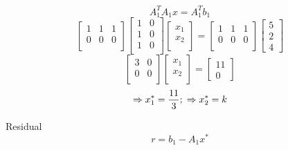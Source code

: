 \documentclass[unicode,11pt,a4paper,oneside,numbers=endperiod,openany]{scrartcl}
\begin{document}
\begin{itemize}
    \begin{equation}
	    A_1^TA_1x = A_1^Tb_1
	\end{equation}
    \[
    	\begin{bmatrix}
            1 & 1 & 1 \\
            0 & 0 & 0\\
        \end{bmatrix}
        \begin{bmatrix}
            1 & 0 \\
            1 & 0 \\
            1 & 0 \\
        \end{bmatrix}
        \begin{bmatrix}
        x_1 \\ x_2 \\ 
        \end{bmatrix}
        =
        \begin{bmatrix}
            1 & 1 & 1 \\
            0 & 0 & 0\\
        \end{bmatrix}
        \begin{bmatrix}
        5 \\ 2 \\ 4
        \end{bmatrix}
    \]
    \[
        \begin{bmatrix}
        3 & 0 \\
        0 & 0 \\
        \end{bmatrix}
        \begin{bmatrix}
        x_1 \\ x_2 \\ 
        \end{bmatrix}
        =
        \begin{bmatrix}
        11 \\ 0
        \end{bmatrix}
    \]
    \begin{equation}
	    \Rightarrow x_1^* = \frac{11}{3};
	    \\
	    \Rightarrow x_2^* = k
	\end{equation}
    
	{Residual}\\
	 \begin{equation}
	    r = b_1 - A_1x^*
	 \end{equation}
	 

\end{itemize}
\end{document}
